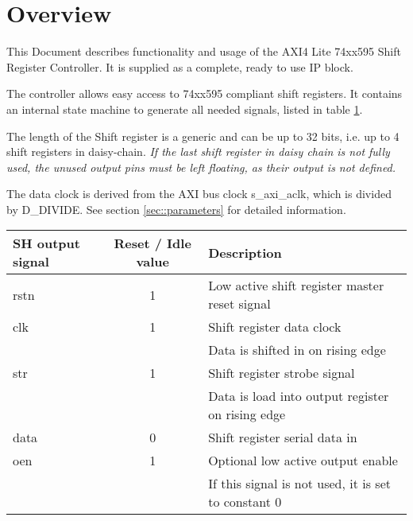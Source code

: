 


\maketitle

\section{Overview}
This Document describes functionality and usage of the AXI4 Lite 74xx595 Shift Register Controller.
It is supplied as a complete, ready to use IP block.

The controller allows easy access to 74xx595 compliant shift registers.
It contains an internal state machine to generate all needed signals, listed in table \ref{tbl::signals}.

The length of the Shift register is a generic and can be up to 32 bits, i.e. up to 4 shift registers in daisy-chain.
\emph{If the last shift register in daisy chain is not fully used, the unused output pins must be left floating, as their output is not defined.}

The data clock is derived from the AXI bus clock s\_axi\_aclk, which is divided by D\_DIVIDE.
See section \ref{sec::parameters} for detailed information.

\begin{table}[htbp]
	
	\label{tbl::signals}
	\begin{tabular}{|l|c|l|}
		\hline 
		SH output signal & Reset / Idle value & Description \\ 
		\hline 
		rstn & 1 & Low active shift register master reset signal \\ 
		\hline 
		clk & 1 & Shift register data clock \\
		& & Data is shifted in on rising edge \\ 
		\hline 
		str & 1 & Shift register strobe signal \\
		 & & Data is load into output register on rising edge\\ 
		\hline 
		data & 0 & Shift register serial data in \\ 
		\hline 
		oen & 1 & Optional low active output enable \\
		& & If this signal is not used, it is set to constant 0 \\ 
		\hline 
	\end{tabular} 

\end{table}

